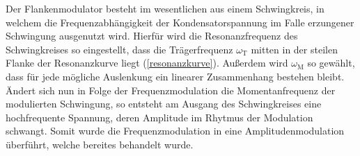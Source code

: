 Der Flankenmodulator besteht im wesentlichen aus einem Schwingkreis, in welchem die Frequenzabhängigkeit der Kondensatorspannung im Falle erzungener Schwingung ausgenutzt wird. Hierfür wird die Resonanzfrequenz des Schwingkreises so eingestellt, dass die Trägerfrequenz $\omega_\text{T}$ mitten in der steilen Flanke der Resonanzkurve liegt (\autoref{resonanzkurve}). Außerdem wird $\omega_\text{M}$ so gewählt, dass für jede mögliche Auslenkung ein linearer Zusammenhang bestehen bleibt. Ändert sich nun in Folge der Frequenzmodulation die Momentanfrequenz der modulierten Schwingung, so entsteht am Ausgang des Schwingkreises eine hochfrequente Spannung, deren Amplitude im Rhytmus der Modulation schwangt. Somit wurde die Frequenzmodulation in eine Amplitudenmodulation überführt, welche bereites behandelt wurde.
